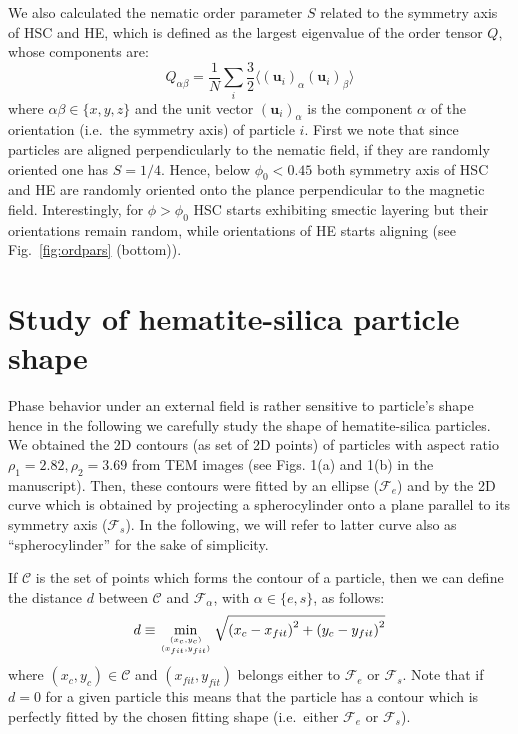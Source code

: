 \documentclass[aip,graphicx]{revtex4-1} %
\def\ontop#1#2{\genfrac{}{}{0pt}{}{#1}{#2}}
\begin{document}
We also calculated the nematic order parameter $S$ related to the symmetry axis of HSC and HE, which
is defined as the largest eigenvalue of the order tensor $Q$, whose components are:
\begin{equation}
  Q_{\alpha\beta} = \frac{1}{N} \sum_i \frac{3}{2} \langle {(\mathbf{u}_i)}_\alpha {(\mathbf{u}_i)}_\beta\rangle
\label{eq:nemop}
\end{equation}
where $\alpha\beta\in\{x,y,z\}$ and the unit vector ${(\mathbf{u}_i)}_\alpha$ is the component $\alpha$ of the orientation (i.e.~the symmetry axis) of particle $i$.
First we note that since particles are aligned perpendicularly to the nematic field, if they are 
randomly oriented one has $S=1/4$. Hence, below $\phi_0 < 0.45$ both symmetry axis of HSC and HE are 
randomly oriented onto the plance perpendicular to the magnetic field.
Interestingly, for $\phi > \phi_0$ HSC starts exhibiting smectic layering but their orientations
remain random, while orientations of HE starts aligning (see Fig.~\ref{fig:ordpars} (bottom)).

\section{Study of hematite-silica particle shape}
Phase behavior under an external field is rather sensitive to particle's shape hence in the following
we carefully study the shape of hematite-silica particles.
We obtained the 2D contours (as set of 2D points) of particles with aspect ratio $\rho_1 = 2.82, \rho_2 = 3.69$ from TEM images 
(see Figs. 1(a) and 1(b) in the manuscript).
Then, these contours were fitted by an ellipse ($\mathcal{F}_{e}$) and by the 2D curve which is obtained by projecting a spherocylinder 
onto a plane parallel to its symmetry axis ($\mathcal{F}_{s}$). In the following, we will refer to latter curve also as 
``spherocylinder'' for the sake of simplicity.

If $\mathcal{C}$ is the set of points which forms the contour of a particle, then we can define the distance $d$ between
$\mathcal{C}$ and $\mathcal{F}_\alpha$, with $\alpha\in\{e,s\}$, as follows:
\begin{equation}
  d \equiv \min_{\ontop{(x_c,y_c)}{(x_{fit}, y_{fit})}} \sqrt{{(x_c - x_{fit})}^2 + {(y_c - y_{fit})}^2}\label{eq:distdef}
\end{equation}
where $(x_c,y_c)\in \mathcal{C}$ and $(x_{fit},y_{fit})$ belongs either to $\mathcal{F}_e$ or $\mathcal{F}_s$.
Note that if $d=0$ for a given particle this means that the particle has a contour which is perfectly fitted
by the chosen fitting shape (i.e.~either $\mathcal{F}_e$ or $\mathcal{F}_s$).
\end{document}
